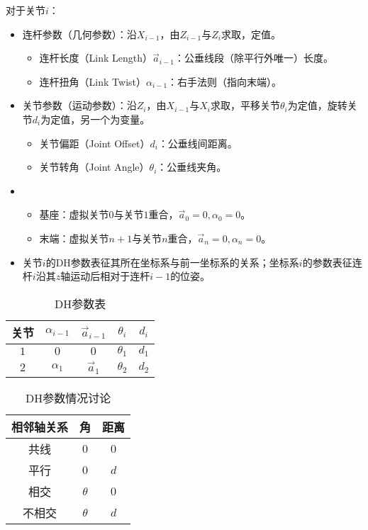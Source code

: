 \documentclass[
12pt, %
a4paper, 
oneside, %
headinclude,footinclude, %
]{scrartcl}
\begin{document}
对于关节$ i $：
\begin{itemize}
\item 连杆参数（几何参数）：沿$ X_{i - 1} $，由$ Z_{i - 1} $与$ Z_i $求取，定值。
\begin{itemize}
\item 连杆长度（Link Length）$ \vec{a}_{i - 1} $：公垂线段（除平行外唯一）长度。
\item 连杆扭角（Link Twist）$ \alpha_{i - 1} $：右手法则（指向末端）。
\end{itemize}
\item 关节参数（运动参数）：沿$ Z_i $，由$ X_{i - 1} $与$ X_i $求取，平移关节$ \theta_i $为定值，旋转关节$ d_i $为定值，另一个为变量。
\begin{itemize}
\item 关节偏距（Joint Offset）$ d_i $：公垂线间距离。
\item 关节转角（Joint Angle）$ \theta_i $：公垂线夹角。
\end{itemize}
\item 
\begin{itemize}
\item 基座：虚拟关节$ 0 $与关节$ 1 $重合，$ \vec{a}_0 = 0, \alpha_0 = 0 $。
\item 末端：虚拟关节$ n + 1 $与关节$ n $重合，$ \vec{a}_n = 0, \alpha_n = 0 $。
\end{itemize}
\item 关节$ i $的DH参数表征其所在坐标系与前一坐标系的关系；坐标系$ i $的参数表征连杆$ i $沿其$ z $轴运动后相对于连杆$ i - 1 $的位姿。
\end{itemize}
\begin{minipage}{0.5\textwidth}
\begin{table}[H]
\centering
\begin{tabular}{c|cccc}
\hline
关节 & $ \alpha_{i - 1} $ & $ \vec{a}_{i - 1} $ & $ \theta_i $ & $ d_i $ \\
\hline
$ 1 $ & $ 0 $ & $ 0 $ & $ \theta_1 $ & $ d_1 $ \\
$ 2 $ & $ \alpha_1 $ & $ \vec a_1 $ & $ \theta_2 $ & $ d_2 $ \\
\hline
\end{tabular}
\caption{DH参数表}
\end{table}
\end{minipage}
\begin{minipage}{0.5\textwidth}
\begin{table}[H]
\centering
\begin{tabular}{c|cc}
\hline
相邻轴关系 & 角 & 距离 \\
\hline
共线 & $ 0 $ & $ 0 $ \\
平行 & $ 0 $ & $ d $ \\
相交 & $ \theta $ & $ 0 $ \\
不相交 & $ \theta $ & $ d $ \\
\hline
\end{tabular}
\caption{DH参数情况讨论}
\end{table}
\end{minipage}
\end{document}
